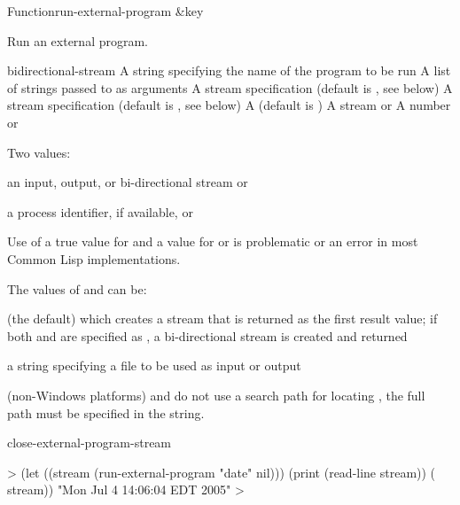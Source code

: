 \documentclass[10pt,twoside,english,pdftex]{article}
\begin{document}
\begin{functiondoc}{Function}{run-external-program}{
  \&key 
  \mbox{\returns{} }}
%
%

\fnsyntax

\fnpurpose Run an external program.

\fnpackage {}

\fnmodule {}

\fnargs
\begin{args}{bidirectional-stream}
\arg[program] A string specifying the name of the program to be run
\arg[arguments] A list of strings passed to  as arguments
\arg[input] A stream specification (default is , see below)
\arg[output] A stream specification (default is , see below)
\arg[wait] A  (default is \nil)
 A stream or \nil{}
\arg[process-id] A number or \nil{}
\end{args}

\fnreturns Two values:
\begin{tightitemize}
\item an input, output, or bi-directional stream or \nil{}
\item a process identifier, if available, or \nil{}
\end{tightitemize}
  
\fnerrors
Use of a true value for  and a  value for
 or  is problematic or an error in most
Common Lisp implementations.

\fndescription
The values of  and  can be:
\begin{tightitemize}
\item {} (the default) which creates a stream that is
  returned as the first result value; if both  and
   are specified as , a bi-directional
  stream is created and returned
\item a string specifying a file to be used as input or output
\end{tightitemize}

 (non-Windows platforms) and
 do not use a search path for
locating , the full path must be specified in the 
string.

\begin{alsos}{close-external-program-stream}
\end{alsos}

%
\fnexample
%
\W\supp
\begin{example}
  > (let ((stream (run-external-program "date" nil)))
       (print (read-line stream))
       ( stream))
  "Mon Jul  4 14:06:04 EDT 2005" 
  >
\end{example}

\end{functiondoc}
\end{document}
